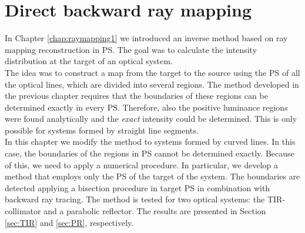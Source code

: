 \chapter{Direct backward ray mapping}
\label{chap:raymapping2}
In Chapter \ref{chap:raymapping1} we introduced an inverse method based on ray mapping reconstruction in PS.
The goal was to calculate the intensity distribution at the target of an optical system. \\ \indent
The idea was to construct a map from the target  to the source  using the PS of all the optical lines, which are divided into several regions.  
The method developed in the previous chapter requires that the boundaries of these regions can be determined exactly in every PS. Therefore, also the positive luminance regions were found analytically and the \textit{exact} intensity could be determined. This is only possible for systems formed by straight line segments.\\ \indent
In this chapter we modify the method to systems formed by curved lines. In this case, the boundaries of the regions in PS cannot be determined exactly.
Because of this, we need to apply a numerical procedure. In particular, we develop a method that employs only the PS of the target of the system. 
The boundaries are detected applying a bisection procedure in target PS in combination with backward ray tracing. The method is tested for two optical systems: the TIR-collimator and a parabolic reflector. The results are presented in Section \ref{sec:TIR} and \ref{sec:PR}, respectively.
